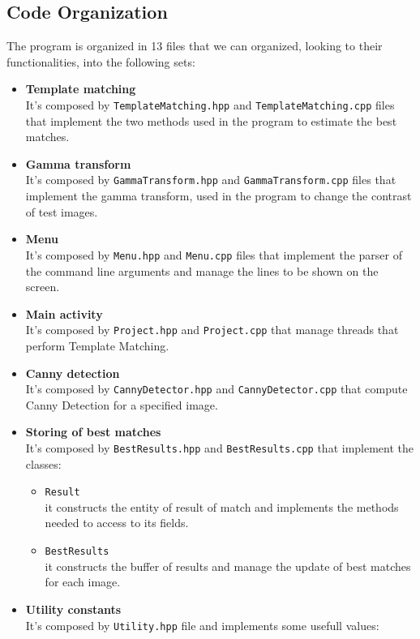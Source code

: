 \documentclass{article}
\begin{document}
\subsection{Code Organization}
The program is organized in 13 files that we can organized, looking to their functionalities, into the following sets:
\begin{itemize}
\item{\textbf{Template matching}\\
It's composed by \texttt{TemplateMatching.hpp} and \texttt{TemplateMatching.cpp} files that implement the two methods used in the program to estimate the best matches.
}
\item{\textbf{Gamma transform}\\
It's composed by \texttt{GammaTransform.hpp} and \texttt{GammaTransform.cpp} files that implement the gamma transform, used in the program to change the contrast of test images. 
}
\item{\textbf{Menu}\\
It's composed by \texttt{Menu.hpp} and \texttt{Menu.cpp} files that implement the parser of the command line arguments and manage the lines to be shown on the screen.
}
\item{\textbf{Main activity}\\
It's composed by \texttt{Project.hpp} and \texttt{Project.cpp} that manage threads that perform Template Matching.
}
\item{\textbf{Canny detection}\\
It's composed by \texttt{CannyDetector.hpp} and \texttt{CannyDetector.cpp} that compute Canny Detection for a specified image.
}
\item{\textbf{Storing of best matches}\\
It's composed by \texttt{BestResults.hpp} and \texttt{BestResults.cpp} that implement the classes:
\begin{itemize}
\item{\texttt{Result}\\
it constructs the entity of result of match and implements the methods needed to access to its fields.
}
\item{\texttt{BestResults}\\
it constructs the buffer of results and manage the update of best matches for each image.
}
\end{itemize}
}
\item{\textbf{Utility constants}\\
It's composed by \texttt{Utility.hpp} file and implements some usefull values:
}
\end{itemize}
\end{document}
